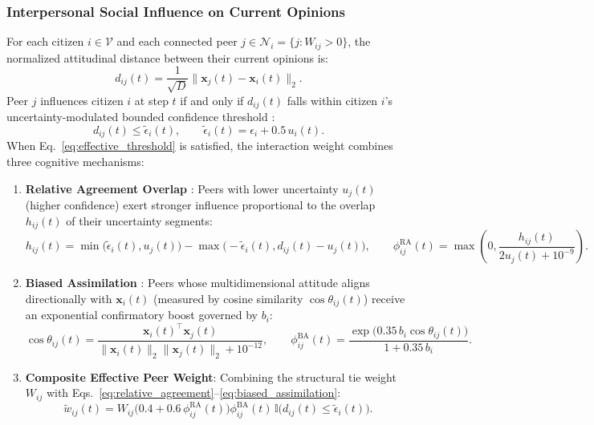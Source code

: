 \subsubsection{Interpersonal Social Influence on Current Opinions}
For each citizen $i \in \mathcal{V}$ and each connected peer $j \in \mathcal{N}_i = \{j : W_{ij} > 0\}$, the normalized attitudinal distance between their current opinions is:
\begin{equation}
    d_{ij}(t) = \frac{1}{\sqrt{D}} \|\mathbf{x}_j(t) - \mathbf{x}_i(t)\|_2.
    \label{eq:peer_dist}
\end{equation}
Peer $j$ influences citizen $i$ at step $t$ if and only if $d_{ij}(t)$ falls within citizen $i$'s uncertainty-modulated bounded confidence threshold \citep{deffuant2000mixing, deffuant2002how, hegselmann2002opinion}:
\begin{equation}
    d_{ij}(t) \le \tilde{\epsilon}_i(t), \qquad \tilde{\epsilon}_i(t) = \epsilon_i + 0.5\,u_i(t).
    \label{eq:effective_threshold}
\end{equation}
When Eq.~\eqref{eq:effective_threshold} is satisfied, the interaction weight combines three cognitive mechanisms:
\begin{enumerate}
    \item \textbf{Relative Agreement Overlap} \citep{deffuant2002how}: Peers with lower uncertainty $u_j(t)$ (higher confidence) exert stronger influence proportional to the overlap $h_{ij}(t)$ of their uncertainty segments:
    \begin{equation}
        h_{ij}(t) = \min\!\big(\tilde{\epsilon}_i(t), u_j(t)\big) - \max\!\big(-\tilde{\epsilon}_i(t), d_{ij}(t) - u_j(t)\big), \qquad
        \phi_{ij}^{\mathrm{RA}}(t) = \max\!\left(0, \frac{h_{ij}(t)}{2u_j(t) + 10^{-9}}\right).
        \label{eq:relative_agreement}
    \end{equation}
    \item \textbf{Biased Assimilation} \citep{lord1979biased, dandekar2013biased}: Peers whose multidimensional attitude aligns directionally with $\mathbf{x}_i(t)$ (measured by cosine similarity $\cos\theta_{ij}(t)$) receive an exponential confirmatory boost governed by $b_i$:
    \begin{equation}
        \cos\theta_{ij}(t) = \frac{\mathbf{x}_i(t)^\top \mathbf{x}_j(t)}{\|\mathbf{x}_i(t)\|_2 \|\mathbf{x}_j(t)\|_2 + 10^{-12}}, \qquad
        \phi_{ij}^{\mathrm{BA}}(t) = \frac{\exp\!\big(0.35\,b_i \cos\theta_{ij}(t)\big)}{1 + 0.35\,b_i}.
        \label{eq:biased_assimilation}
    \end{equation}
    \item \textbf{Composite Effective Peer Weight}: Combining the structural tie weight $W_{ij}$ with Eqs.~\eqref{eq:relative_agreement}--\eqref{eq:biased_assimilation}:
    \begin{equation}
        \tilde{w}_{ij}(t) = W_{ij} \big(0.4 + 0.6\,\phi_{ij}^{\mathrm{RA}}(t)\big) \phi_{ij}^{\mathrm{BA}}(t) \, \mathbb{I}\!\big(d_{ij}(t) \le \tilde{\epsilon}_i(t)\big).
        \label{eq:effective_peer_weight}
    \end{equation}
\end{enumerate}

